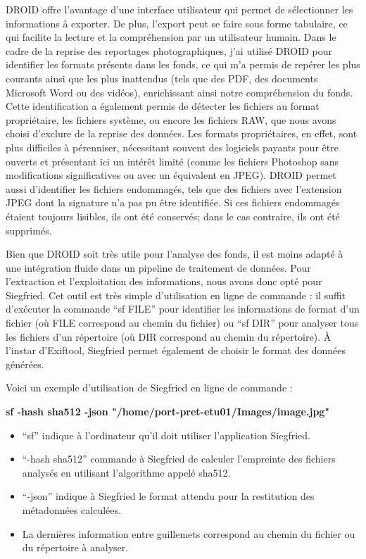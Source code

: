 DROID offre l'avantage d'une interface utilisateur qui permet de sélectionner les informations à exporter. De plus, l'export peut se faire sous forme tabulaire, ce qui facilite la lecture et la compréhension par un utilisateur humain. Dans le cadre de la reprise des reportages photographiques, j'ai utilisé DROID pour identifier les formats présents dans les fonds, ce qui m'a permis de repérer les plus courants ainsi que les plus inattendus (tels que des PDF, des documents Microsoft Word ou des vidéos), enrichissant ainsi notre compréhension du fonds. Cette identification a également permis de détecter les fichiers au format propriétaire, les fichiers système, ou encore les fichiers RAW, que nous avons choisi d'exclure de la reprise des données. Les formats propriétaires, en effet, sont plus difficiles à pérenniser, nécessitant souvent des logiciels payants pour être ouverts et présentant ici un intérêt limité (comme les fichiers Photoshop sans modifications significatives ou avec un équivalent en JPEG). DROID permet aussi d'identifier les fichiers endommagés, tels que des fichiers avec l'extension JPEG dont la signature n'a pas pu être identifiée. Si ces fichiers endommagés étaient toujours lisibles, ils ont été conservés; dans le cas contraire, ils ont été supprimés.

Bien que DROID soit très utile pour l'analyse des fonds, il est moins adapté à une intégration fluide dans un pipeline de traitement de données. Pour l'extraction et l'exploitation des informations, nous avons donc opté pour Siegfried. Cet outil est très simple d'utilisation en ligne de commande : il suffit d'exécuter la commande \enquote{sf FILE} pour identifier les informations de format d'un fichier (où FILE correspond au chemin du fichier) ou \enquote{sf DIR} pour analyser tous les fichiers d'un répertoire (où DIR correspond au chemin du répertoire). À l'instar d'Exiftool, Siegfried permet également de choisir le format des données générées.

Voici un exemple d'utilisation de Siegfried en ligne de commande : 

\begin{displayquote}
	\begin{center}
		\textbf{sf -hash sha512 -json "/home/port-pret-etu01/Images/image.jpg"}
	\end{center}
\end{displayquote}

\begin{itemize}
	\item \enquote{sf} indique à l'ordinateur qu'il doit utiliser l'application Siegfried.
	\item \enquote{-hash sha512} commande à Siegfried de calculer l'empreinte des fichiers analysés en utilisant l'algorithme appelé sha512.
	\item \enquote{-json} indique à Siegfried le format attendu pour la restitution des métadonnées calculées.
	\item La dernières information entre guillemets correspond au chemin du fichier ou du répertoire à analyser.
\end{itemize}


